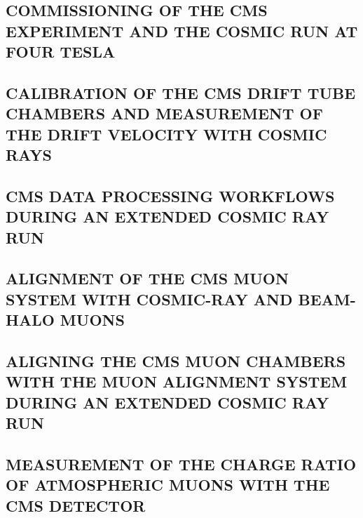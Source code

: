 \documentclass[a4paper, 11pt, twoside, openright]{report}
\begin{document}
\subsection{COMMISSIONING OF THE CMS EXPERIMENT AND THE COSMIC RUN AT FOUR TESLA}


\subsection{CALIBRATION OF THE CMS DRIFT TUBE CHAMBERS AND MEASUREMENT OF THE DRIFT VELOCITY WITH COSMIC RAYS}


\subsection{CMS DATA PROCESSING WORKFLOWS DURING AN EXTENDED COSMIC RAY RUN}


\subsection{ALIGNMENT OF THE CMS MUON SYSTEM WITH COSMIC-RAY AND BEAM-HALO MUONS}


\subsection{ALIGNING THE CMS MUON CHAMBERS WITH THE MUON ALIGNMENT SYSTEM DURING AN EXTENDED COSMIC RAY RUN}


\subsection{MEASUREMENT OF THE CHARGE RATIO OF ATMOSPHERIC MUONS WITH THE CMS DETECTOR}

\end{document}
